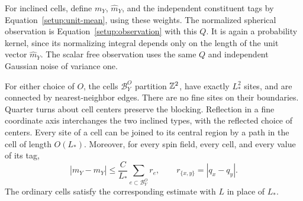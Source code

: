 For inclined cells, define $m_Y$, $\widehat m_Y$, and the independent
constituent tags by Equation~\eqref{setup:unit-mean}, using these weights.
The normalized spherical observation is Equation~\eqref{setup:observation}
with this $Q$.  It is again a probability kernel, since its normalizing
integral depends only on the length of the unit vector $\widehat m_Y$.
The scalar free observation uses the same $Q$ and independent Gaussian
noise of variance one.

\begin{lemma}
\label{lem:free-inclined-geometry}
For either choice of $O$, the cells $\mathcal B_Y^O$ partition $\mathbb Z^2$,
have exactly $L_*^2$ sites, and are connected by nearest-neighbor edges.
There are no fine sites on their boundaries.  Quarter turns about cell
centers preserve the blocking.  Reflection in a fine coordinate axis
interchanges the two inclined types, with the reflected choice of centers.
Every site of a cell can be joined to its central region by a path in the
cell of length $O(L_*)$.  Moreover, for every spin field, every cell, and
every value of its tag,
\begin{equation}
 |m_Y-\widehat m_Y|
 \le \frac{C}{L_*}\sum_{e\subset\mathcal B_Y^O}r_e,
 \qquad r_{\{x,y\}}=|q_x-q_y|.
 \label{eq:orig-3}
\end{equation}
The ordinary cells satisfy the corresponding estimate with $L$ in place
of $L_*$.
\end{lemma}

